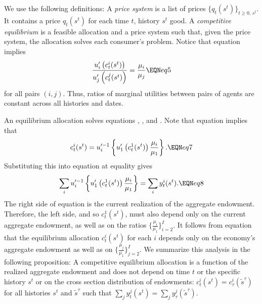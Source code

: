 We use the following  definitions:
\medskip
{} A {\it price system} is a list of
prices $\{q_t(s^t)\}_{t\geq0,\,s^t}$. It contains  a price $q_t(s^t)$ for each 
time $t$, history $s^t$ good. 
\medskip
{} A {\it competitive equilibrium} is
a feasible allocation and a price system such that, given
the price system,  the allocation solves
each consumer's problem.
\medskip
Notice that equation  implies
$$ {u'_i\left(c_t^i(s^t)\right) \over
 u'_j\left(c_t^j(s^t)\right) }
 = {\mu_i\over \mu_j}          \EQN eq5 $$
for all pairs $(i,j)$.
Thus, ratios of marginal utilities between pairs of agents are
constant across all histories and dates.


An equilibrium allocation solves equations  ,  ,
and . Note that equation  implies that
$$ c_t^i(s^t) = u^{\prime -1}_i  
  \left\{u'_1\left(c_t^1(s^t)\right) {\mu_i \over \mu_1}
 \right\}. \EQN eq7 $$
Substituting this into equation  at equality gives
$$ \sum_i
u^{\prime -1}_i  \left\{u'_1\left(c_t^1(s^t)\right) 
{\mu_i \over \mu_1}\right\} =
       \sum_i y_t^i(s^t) .  \EQN eq8 $$
The right side of equation  is the current realization of
the aggregate endowment. %
Therefore, the left
side, and  so $c_t^1(s^t)$,  must also depend only on the current
aggregate endowment, as well as on the ratios
$\{ {\frac{\mu_i}{\mu_1}} \}_{i=2}^I$.  It follows from equation  that the
equilibrium allocation $c_t^i(s^t)$ for each $i$ depends only on
the economy's aggregate endowment as well as on
$\{ {\frac{\mu_j}{\mu_1}} \}_{j=2}^I$. We summarize this analysis  in
the following proposition:
\medskip
{}  A competitive equilibrium allocation
is a function of the realized aggregate endowment and does not depend
on time $t$ or the specific history $s^t$ or on
the cross section distribution of endowments:
$c_t^i(s^t)=c_\tau^i(\tilde s^{\tau})$ for all histories $s^t$ and $\tilde
s^{\tau}$ such that $\sum_j y_t^j(s^t) = \sum_j y_\tau^j(\tilde
s^{\tau})$.


\medskip









